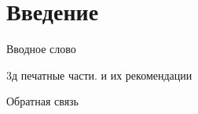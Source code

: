 \section*{Введение}

Вводное слово

3д печатные части. и их рекомендации

Обратная связь

\clearpage
